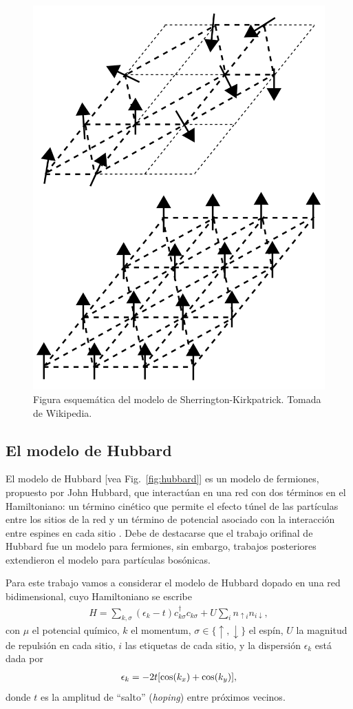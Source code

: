 \documentclass[letterpaper,superscriptaddress,aps,pra,nolongbibliography,twocolumn,showpacs,floatfix,10pt]{revtex4-2} %
\renewcommand{\>}{\rangle}
\newcommand{\<}{\langle}
\newcommand{\Fref}[1]{Fig.~\ref{#1}}
\begin{document}
\begin{figure}
\includegraphics[width=0.5\columnwidth]{spin_glass}
\caption{Figura esquemática del modelo de Sherrington-Kirkpatrick. Tomada de Wikipedia.}
\label{fig:shk}
\end{figure}

\subsection{El modelo de Hubbard}\label{sec:Hub}
El modelo de Hubbard [vea \Fref{fig:hubbard}] es un modelo de fermiones, propuesto por John Hubbard,
que interactúan en una red con dos términos en el Hamiltoniano: un término
cinético que permite el efecto túnel de las partículas entre los sitios de la red y un 
término de potencial asociado con la interacción entre espines en cada
sitio \cite{altland2006interaction}. Debe de destacarse que el trabajo 
orifinal de Hubbard fue un modelo para fermiones, sin embargo, trabajos
posteriores extendieron el modelo para partículas bosónicas.

Para este trabajo vamos a considerar el modelo de Hubbard dopado en una
red bidimensional, cuyo Hamiltoniano se escribe~\citep{simkovic2021manyconfiguration}
\begin{align}
H=\sum_{k,\sigma}(\epsilon_k-t 	)c_{k\sigma}^{\dagger}c_{k\sigma}
+
U\sum_{i}n_{\uparrow i}n_{i\downarrow},
\end{align}
con $\mu$ el potencial químico, $k$ el momentum, 
$\sigma\in \{\uparrow,\downarrow\}$ el espín, $U$ la magnitud de repulsión
en cada sitio, $i$ las etiquetas de cada sitio, y la dispersión $\epsilon_k$
está dada por
\begin{align}
\epsilon_k=-2t\qty[\cos(k_x) +\cos(k_y)],
\end{align}
donde $t$ es la amplitud de ``salto'' (\textit{hoping}) entre próximos vecinos.
\end{document}
